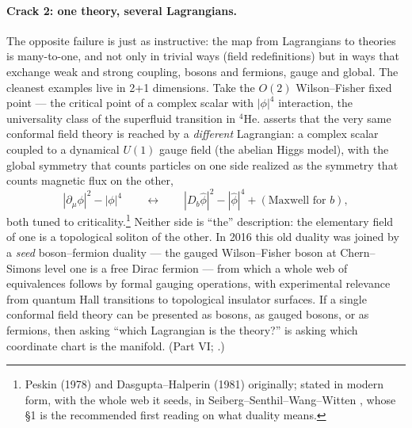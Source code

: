 \paragraph{Crack 2: one theory, several Lagrangians.}
The opposite failure is just as instructive: the map from Lagrangians to
theories is many-to-one, and not only in trivial ways (field redefinitions) but
in ways that exchange weak and strong coupling, bosons and fermions, gauge and
global. The cleanest examples live in 2+1 dimensions. Take the $O(2)$
Wilson--Fisher fixed point --- the critical point of a complex scalar with
$|\phi|^4$ interaction, the universality class of the superfluid transition in
$^4$He.  asserts that the very same conformal
field theory is reached by a \emph{different} Lagrangian: a complex scalar
coupled to a dynamical $U(1)$ gauge field (the abelian Higgs model), with the
global symmetry that counts particles on one side realized as the symmetry that
counts magnetic flux on the other,
\begin{equation}
|\partial_\mu \phi|^2 - |\phi|^4
\qquad \longleftrightarrow \qquad
|D_b \hat\phi|^2 - |\hat\phi|^4 + (\text{Maxwell for } b),
\label{eq:particle-vortex}
\end{equation}
both tuned to criticality.\footnote{Peskin (1978) and Dasgupta--Halperin (1981)
originally; stated in modern form, with the whole web it seeds, in
Seiberg--Senthil--Wang--Witten , whose \S1 is the recommended
first reading on what duality means.} Neither side is ``the'' description: the
elementary field of one is a topological soliton of the other. In 2016 this old
duality was joined by a \emph{seed} boson--fermion duality --- the gauged
Wilson--Fisher boson at Chern--Simons level one is a free Dirac fermion --- from
which a whole web of equivalences follows by formal gauging operations, with
experimental relevance from quantum Hall transitions to topological insulator
surfaces. If a single conformal field theory can be presented as bosons, as
gauged bosons, or as fermions, then asking ``which Lagrangian is the theory?''
is asking which coordinate chart is the manifold. (Part VI;
.)

